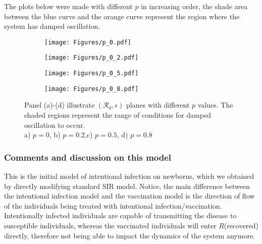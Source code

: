 \documentclass[12pt]{article}
\newcommand{\R}{\mathcal{R}}
\begin{document}
The plots below were made with different $p$ in increasing order, the shade area between the blue curve and the orange curve represent the region where the system has damped oscillation.

\begin{figure}[h]
\centering

\begin{subfigure}[t]{.4\textwidth}
\centering
\texttt{[image: Figures/p\_0.pdf]}
        \caption{}\label{fig:fig_a}
\end{subfigure}
%
\begin{subfigure}[t]{.4\textwidth}
\centering
\texttt{[image: Figures/p\_0\_2.pdf]}
\caption{}\label{fig:fig_b}
\end{subfigure}

\medskip

\begin{subfigure}[t]{.4\textwidth}
\centering
\vspace{0pt}%
\texttt{[image: Figures/p\_0\_5.pdf]}
\caption{}\label{fig:fig_c}
\end{subfigure}
%
\begin{subfigure}[t]{.4\textwidth}
\centering
\vspace{0pt}%
\texttt{[image: Figures/p\_0\_8.pdf]}
\caption{}\label{fig:fig_d}
\end{subfigure}
%
\begin{minipage}[t]{0.9\textwidth}
\caption{Panel (a)-(d) illustrate $(\R_0,\epsilon)$ planes with different $p$ values. The shaded regions represent the range of conditions for damped oscillation to occur.\\ a) $p=0$, b) $p=0.2$,c) $p=0.5$, d) $p=0.8$}
\end{minipage}
\end{figure}

\clearpage

\subsubsection{Comments and discussion on this model}
This is the initial model of intentional infection on newborns, which we obtained by directly modifying standard SIR model. Notice, the main difference between the intentional infection model and the vaccination model is the direction of flow of the individuals being treated with intentional infection/vaccination. Intentionally infected individuals are capable of transmitting the disease to susceptible individuals, whereas the vaccinated individuals will enter $R$(recovered) directly, therefore not being able to impact the dynamics of the system anymore. 
\end{document}
